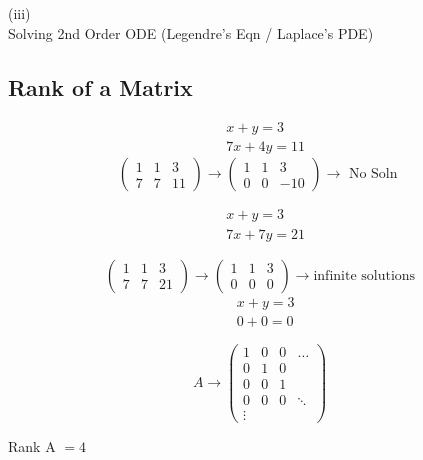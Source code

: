 \documentclass[svgnames]{article}   	%
\begin{document}
\noindent (iii) \mbox{} \\
Solving 2nd Order ODE (Legendre's Eqn / Laplace's PDE)


\subsection{Rank of a Matrix}

\begin{tcolorbox}[colback = blue!5!white, colframe = blue!50!black, title
  = Example 1]
  
  \begin{align*}
    &x + y = 3 \\
    & 7x + 4y = 11 
  \end{align*}
\[
  \begin{pmatrix}
    1 & 1 & 3 \\
    7 & 7 & 11
  \end{pmatrix} \rightarrow 
  \begin{pmatrix}
    1 & 1 & 3 \\
    0 & 0 & -10
  \end{pmatrix} \rightarrow \text{ No Soln } 
\]
\end{tcolorbox}

\begin{tcolorbox}[colback = red!5!white, colframe = red!50!black, title
  = Example 2]
  
  \begin{align*}
    & x + y = 3 \\
    & 7x + 7y = 21
  \end{align*}

  \[
  \begin{pmatrix}
    1 & 1 & 3 \\
    7 & 7 & 21
  \end{pmatrix} \rightarrow 
  \begin{pmatrix}
    1 & 1 & 3 \\ 
    0 & 0 & 0
  \end{pmatrix} \rightarrow \text{infinite solutions}
  \] \vspace{5px} 
  \begin{align*}
    &x + y = 3 \\
    &0 + 0 = 0
  \end{align*} 
  
\end{tcolorbox}

\begin{tcolorbox}[colback = blue!5!white, colframe = blue!50!black, title
  = General]
  
  \[
  A \rightarrow 
  \begin{pmatrix}
    1 & 0 & 0 & \dots \\
    0 & 1 & 0 & \\
    0 & 0 & 1 & \\
    0 & 0 & 0 & \ddots \\ 
    \vdots &  & 
  \end{pmatrix}
  \] \vspace{5px} 
  
 Rank A $ = 4$ 

\end{tcolorbox}
\end{document}
